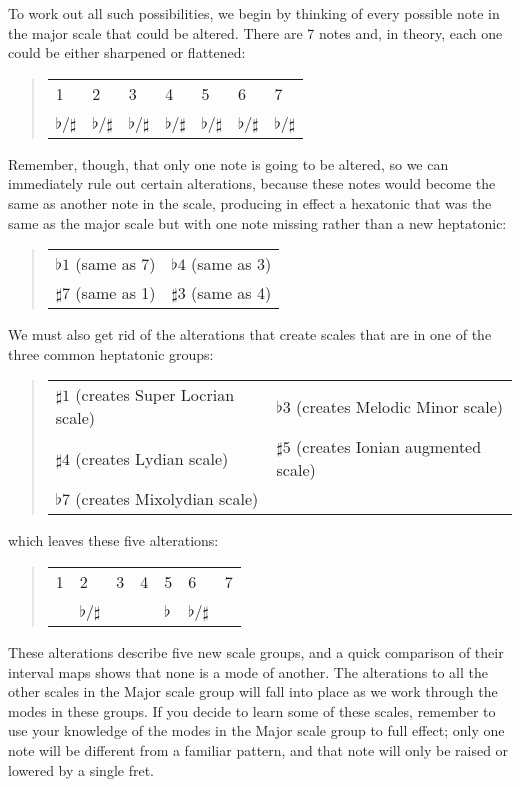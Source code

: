 \documentclass[english]{./gbook}
\begin{document}
\begin{large}
To work out all such possibilities, we begin by thinking of every possible note in the major scale that could be altered. There are 7 notes and, in theory, each one could be either sharpened or flattened:
\begin{quote}
\begin{tabular}{lllllll}
1	&2	&3	&4	&5	&6	&7  \\
$\flat$/$\sharp$&$\flat$/$\sharp$&$\flat$/$\sharp$&$\flat$/$\sharp$&$\flat$/$\sharp$&$\flat$/$\sharp$&$\flat$/$\sharp$
\end{tabular}
\end{quote}
Remember, though, that only one note is going to be altered, so we can immediately rule out certain alterations, because these notes would become the same as another note in the scale, producing in effect a hexatonic that was the same as the major scale but with one note missing rather than a new heptatonic:
\begin{quote}
\begin{tabular}{ll}
$\flat 1$ (same as 7)	&$\flat 4$ (same as 3) \\
$\sharp 7$ (same as 1)	&$\sharp 3$ (same as 4)
\end{tabular}
\end{quote}
We must also get rid of the alterations that create scales that are in one of the three common heptatonic groups:
\begin{quote}
\begin{tabular}{ll}
$\sharp 1$ (creates Super Locrian scale)		&$\flat 3$ (creates Melodic Minor scale) \\
$\sharp 4$ (creates Lydian scale)			&$\sharp 5$ (creates Ionian augmented scale) \\
$\flat 7$ (creates Mixolydian scale)& 
\end{tabular}
\end{quote}
which leaves these five alterations:
\begin{quote}
\begin{tabular}{lllllll}
1	&2	&3	&4	&5	&6	&7 \\
	&$\flat$/$\sharp$&&&$\flat$&$\flat$/$\sharp$
\end{tabular}
\end{quote}

These alterations describe five new scale groups, and a quick comparison of their interval maps shows that none is a mode of another. The alterations to all the other scales in the Major scale group will fall into place as we work through the modes in these groups. If you decide to learn some of these scales, remember to use your knowledge of the modes in the Major scale group to full effect; only one note will be different from a familiar pattern, and that note will only be raised or lowered by a single fret.


\end{large}
\end{document}

